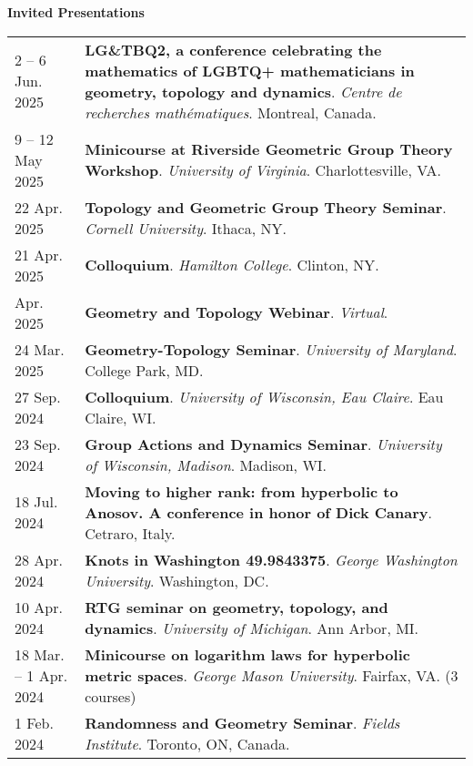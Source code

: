 
    \medskip


    \medskip
    \medskip



    \textbf{\large Invited Presentations}
    
    \begin{center}
    {
    \renewcommand{\arraystretch}{1.5}
    \begin{longtable}{p{}  p{}}
    2  -- 6 Jun.  2025 & \textbf{LG\&TBQ2, a conference celebrating the mathematics of LGBTQ+ mathematicians in geometry, topology and dynamics}. \textit{Centre de recherches math\'ematiques}.  Montreal, Canada.  \\ 
9  -- 12 May  2025 & \textbf{Minicourse at Riverside Geometric Group Theory Workshop}. \textit{University of Virginia}.  Charlottesville, VA.  \\ 
22 Apr.  2025 & \textbf{Topology and Geometric Group Theory Seminar}. \textit{Cornell University}.  Ithaca, NY.  \\ 
21 Apr.  2025 & \textbf{Colloquium}. \textit{Hamilton College}.  Clinton, NY.  \\ 
 Apr.  2025 & \textbf{Geometry and Topology Webinar}. \textit{Virtual}.  \\ 
24 Mar.  2025 & \textbf{Geometry-Topology Seminar}. \textit{University of Maryland}.  College Park, MD.  \\ 
27 Sep.  2024 & \textbf{Colloquium}. \textit{University of Wisconsin, Eau Claire}.  Eau Claire, WI.  \\ 
23 Sep.  2024 & \textbf{Group Actions and Dynamics Seminar}. \textit{University of Wisconsin, Madison}.  Madison, WI.  \\ 
18 Jul.  2024 & \textbf{Moving to higher rank: 
from hyperbolic to Anosov.
A conference in honor of Dick Canary}.  Cetraro, Italy.  \\ 
28 Apr.  2024 & \textbf{Knots in Washington 49.9843375}. \textit{George Washington University}.  Washington, DC.  \\ 
10 Apr.  2024 & \textbf{RTG seminar on geometry, topology, and dynamics}. \textit{University of Michigan}.  Ann Arbor, MI.  \\ 
18 Mar.  -- 1 Apr.  2024 & \textbf{Minicourse on logarithm laws for hyperbolic metric spaces}. \textit{George Mason University}.  Fairfax, VA. (3 courses) \\ 
1 Feb.  2024 & \textbf{Randomness and Geometry Seminar}. \textit{Fields Institute}.  Toronto, ON, Canada.  \\ 

\end{longtable}}
\end{center}
